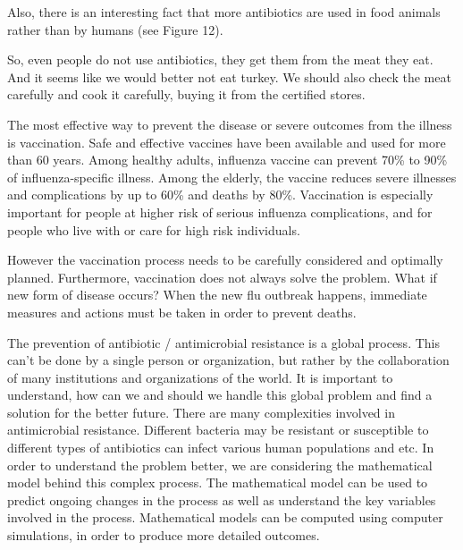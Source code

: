 Also, there is an interesting fact that more antibiotics are used in food animals rather than by humans (see Figure 12).

So, even people do not use antibiotics, they get them from the meat they eat. And it seems like we would better not eat turkey. We should also check the meat carefully and cook it carefully, buying it from the certified stores.

The most effective way to prevent the disease or severe outcomes from the illness is vaccination. Safe and effective vaccines have been available and used for more than 60 years. Among healthy adults, influenza vaccine can prevent 70\% to 90\% of influenza-specific illness. Among the elderly, the vaccine reduces severe illnesses and complications by up to 60\% and deaths by 80\%. Vaccination is especially important for people at higher risk of serious influenza complications, and for people who live with or care for high risk individuals.

However the vaccination process needs to be carefully considered and optimally planned. Furthermore, vaccination does not always solve the problem. What if new form of disease occurs? When the new flu outbreak happens, immediate measures and actions must be taken in order to prevent deaths.

The prevention of antibiotic / antimicrobial resistance is a global process. This can’t be done by a single person or organization, but rather by the collaboration of many institutions and organizations of the world. It is important to understand, how can we and should we handle this global problem and find a solution for the better future. There are many complexities involved in antimicrobial resistance. Different bacteria may be resistant or susceptible to different types of antibiotics can infect various human populations and etc. In order to understand the problem better, we are considering the mathematical model behind this complex process. The mathematical model can be used to predict ongoing changes in the process as well as understand the key variables involved in the process. Mathematical models can be computed using computer simulations, in order to produce more detailed outcomes.


